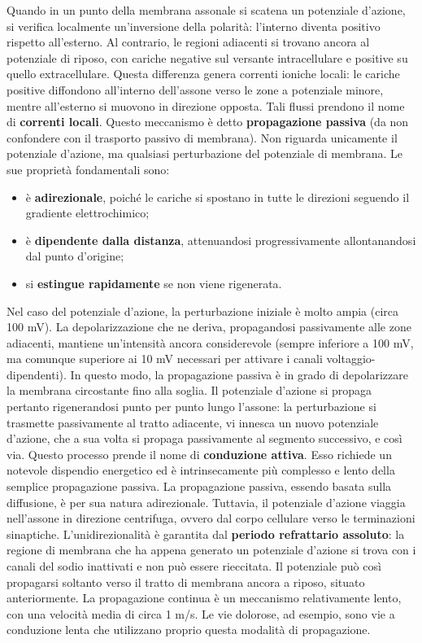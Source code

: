 \documentclass[12pt,a4paper,openany]{book}
\begin{document}
Quando in un punto della membrana assonale si scatena un potenziale d’azione, si verifica localmente un’inversione della polarità: l’interno diventa positivo rispetto all’esterno. Al contrario, le regioni adiacenti si trovano ancora al potenziale di riposo, con cariche negative sul versante intracellulare e positive su quello extracellulare. Questa differenza genera correnti ioniche locali: le cariche positive diffondono all’interno dell’assone verso le zone a potenziale minore, mentre all’esterno si muovono in direzione opposta. Tali flussi prendono il nome di \textbf{correnti locali}.
Questo meccanismo è detto \textbf{propagazione passiva} (da non confondere con il trasporto passivo di membrana). Non riguarda unicamente il potenziale d’azione, ma qualsiasi perturbazione del potenziale di membrana. Le sue proprietà fondamentali sono:
\begin{itemize}
    \item è \textbf{adirezionale}, poiché le cariche si spostano in tutte le direzioni seguendo il gradiente elettrochimico;
    \item è \textbf{dipendente dalla distanza}, attenuandosi progressivamente allontanandosi dal punto d’origine;
    \item si \textbf{estingue rapidamente} se non viene rigenerata.
\end{itemize}

Nel caso del potenziale d’azione, la perturbazione iniziale è molto ampia (circa 100 mV). La depolarizzazione che ne deriva, propagandosi passivamente alle zone adiacenti, mantiene un’intensità ancora considerevole (sempre inferiore a 100 mV, ma comunque superiore ai 10 mV necessari per attivare i canali voltaggio-dipendenti). In questo modo, la propagazione passiva è in grado di depolarizzare la membrana circostante fino alla soglia.
Il potenziale d’azione si propaga pertanto rigenerandosi punto per punto lungo l’assone: la perturbazione si trasmette passivamente al tratto adiacente, vi innesca un nuovo potenziale d’azione, che a sua volta si propaga passivamente al segmento successivo, e così via. Questo processo prende il nome di \textbf{conduzione attiva}. Esso richiede un notevole dispendio energetico ed è intrinsecamente più complesso e lento della semplice propagazione passiva.
La propagazione passiva, essendo basata sulla diffusione, è per sua natura adirezionale. Tuttavia, il potenziale d’azione viaggia nell’assone in direzione centrifuga, ovvero dal corpo cellulare verso le terminazioni sinaptiche. L’unidirezionalità è garantita dal \textbf{periodo refrattario assoluto}: la regione di membrana che ha appena generato un potenziale d’azione si trova con i canali del sodio inattivati e non può essere rieccitata. Il potenziale può così propagarsi soltanto verso il tratto di membrana ancora a riposo, situato anteriormente.
La propagazione continua è un meccanismo relativamente lento, con una velocità media di circa 1 m/s. Le vie dolorose, ad esempio, sono vie a conduzione lenta che utilizzano proprio questa modalità di propagazione.
\end{document}
